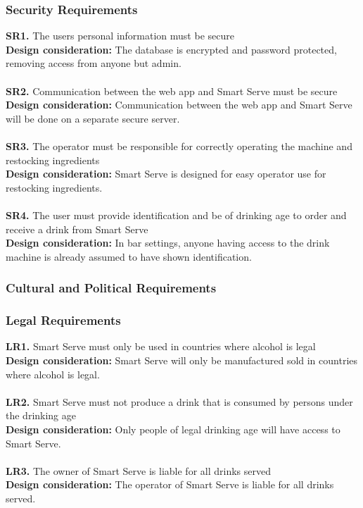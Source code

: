 \documentclass[12pt, titlepage]{article}
\begin{document}
\subsubsection{Security Requirements}
    \noindent\textbf{SR1.} The users personal information must be secure \\
    \indent\textbf{Design consideration:} The database is encrypted and password protected, removing access from anyone but admin.\\\\
    \textbf{SR2.} Communication between the web app and Smart Serve must be secure \\
    \indent\textbf{Design consideration:} Communication between the web app and Smart Serve will be done on a separate secure server.\\\\
    \textbf{SR3.} The operator must be responsible for correctly operating the machine and restocking ingredients \\
    \indent\textbf{Design consideration:} Smart Serve is designed for easy operator use for restocking ingredients.\\\\
    \textbf{SR4.} The user must provide identification and be of drinking age to order and receive a drink from Smart Serve \\
    \indent\textbf{Design consideration:} In bar settings, anyone having access to the drink machine is already assumed to have shown identification.

\subsubsection{Cultural and Political Requirements}
\subsubsection{Legal Requirements}
    \noindent\textbf{LR1.} Smart Serve must only be used in countries where alcohol is legal \\
    \indent\textbf{Design consideration:} Smart Serve will only be manufactured sold in countries where alcohol is legal.\\\\
    \textbf{LR2.} Smart Serve must not produce a drink that is consumed by persons under the drinking age \\
    \indent\textbf{Design consideration:} Only people of legal drinking age will have access to Smart Serve.\\\\
    \textbf{LR3.} The owner of Smart Serve is liable for all drinks served \\
    \indent\textbf{Design consideration:} The operator of Smart Serve is liable for all drinks served.
\end{document}
